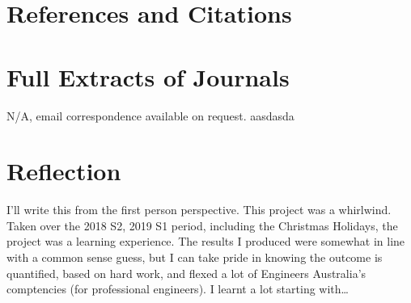 \documentclass{UoNMCHA}
\numberwithin{equation}{section}
\begin{document}
\clearpage \section{References and Citations}\label{sec:RefCite}

 

\newpage
\appendix
\clearpage \section{Full Extracts of Journals}
N/A, email correspondence available on request. aasdasda

\clearpage \section{Reflection}
I'll write this from the first person perspective.
This project was a whirlwind. Taken over the 2018 S2, 2019 S1 period, including the Christmas Holidays, the project was a learning experience. The results I produced were somewhat in line with a common sense guess, but I can take pride in knowing the outcome is quantified, based on hard work, and flexed a lot of Engineers Australia's comptencies (for professional engineers).
I learnt a lot starting with\dots
\end{document}
